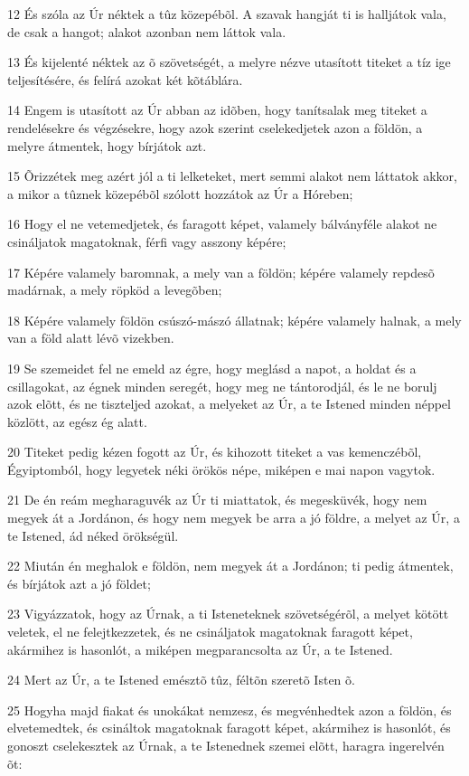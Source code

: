 \par 12 És szóla az Úr néktek a tûz közepébõl. A szavak hangját ti is halljátok vala, de csak a hangot; alakot azonban nem láttok vala.
\par 13 És kijelenté néktek az õ szövetségét, a melyre nézve utasított titeket a tíz ige teljesítésére, és felírá azokat két kõtáblára.
\par 14 Engem is utasított az Úr abban az idõben, hogy tanítsalak meg titeket a rendelésekre és végzésekre, hogy azok szerint cselekedjetek azon a földön, a melyre átmentek, hogy bírjátok azt.
\par 15 Õrizzétek meg azért jól a ti lelketeket, mert semmi alakot nem láttatok akkor, a mikor a tûznek közepébõl szólott hozzátok az Úr a Hóreben;
\par 16 Hogy el ne vetemedjetek, és faragott képet, valamely bálványféle alakot ne csináljatok magatoknak, férfi vagy asszony képére;
\par 17 Képére valamely baromnak, a mely van a földön; képére valamely repdesõ madárnak, a mely röpköd a levegõben;
\par 18 Képére valamely földön csúszó-mászó állatnak; képére valamely halnak, a mely van a föld alatt lévõ vizekben.
\par 19 Se szemeidet fel ne emeld az égre, hogy meglásd a napot, a holdat és a csillagokat, az égnek minden seregét, hogy meg ne tántorodjál, és le ne borulj azok elõtt, és ne tiszteljed azokat, a melyeket az Úr, a te Istened minden néppel közlött, az egész ég alatt.
\par 20 Titeket pedig kézen fogott az Úr, és kihozott titeket a vas kemenczébõl, Égyiptomból, hogy legyetek néki örökös népe, miképen e mai napon vagytok.
\par 21 De én reám megharaguvék az Úr ti miattatok, és megesküvék, hogy nem megyek át a Jordánon, és hogy nem megyek be arra a jó földre, a melyet az Úr, a te Istened, ád néked örökségül.
\par 22 Miután én meghalok e földön, nem megyek át a Jordánon; ti pedig átmentek, és bírjátok azt a jó földet;
\par 23 Vigyázzatok, hogy az Úrnak, a ti Isteneteknek szövetségérõl, a melyet kötött veletek, el ne felejtkezzetek, és ne csináljatok magatoknak faragott képet, akármihez is hasonlót, a miképen megparancsolta az Úr, a te Istened.
\par 24 Mert az Úr, a te Istened emésztõ tûz, féltõn szeretõ Isten õ.
\par 25 Hogyha majd fiakat és unokákat nemzesz, és megvénhedtek azon a földön, és elvetemedtek, és csináltok magatoknak faragott képet, akármihez is hasonlót, és gonoszt cselekesztek az Úrnak, a te Istenednek szemei elõtt, haragra ingerelvén õt:
